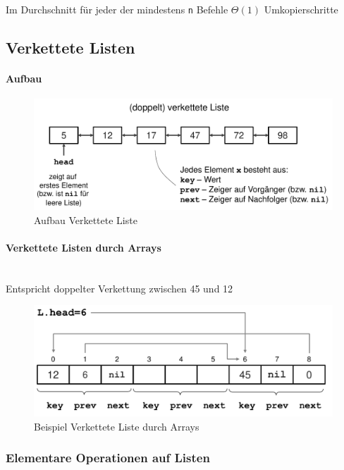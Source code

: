 \documentclass[
    ngerman,
    color=3b,
    load_common, %
    summary,
    boxarc,
]{tuda_summary}
\begin{document}
Im Durchschnitt für jeder der mindestens \texttt{n} Befehle $\Theta(1)$ Umkopierschritte


\clearpage
\subsection{Verkettete Listen}\label{Verkettete Listen}
\paragraph{Aufbau}\mbox{}
\begin{figure}[h]
    \centering
    \includegraphics[width=12cm]{pictures/linkedList1.pdf}
    \caption{Aufbau Verkettete Liste}
\end{figure}


\paragraph{Verkettete Listen durch Arrays}\mbox{}\\
Entspricht doppelter Verkettung zwischen 45 und 12
\begin{figure}[h]
    \centering
    \includegraphics[width=12cm]{pictures/linkedList2.pdf}
    \caption{Beispiel Verkettete Liste durch Arrays}
\end{figure}

\clearpage
\subsubsection{Elementare Operationen auf Listen}
\end{document}
